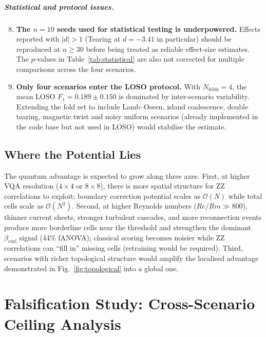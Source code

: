 \documentclass[12pt, a4paper, oneside]{report}
\begin{document}
\paragraph{Statistical and protocol issues.}
\begin{enumerate}
    \setcounter{enumi}{7}
    \item \textbf{The $n = 10$ seeds used for statistical testing is underpowered.} Effects reported with $|d| > 1$ (Tearing at $d = -3.41$ in particular) should be reproduced at $n \ge 30$ before being treated as reliable effect-size estimates. The $p$-values in Table~\ref{tab:statistical} are also not corrected for multiple comparisons across the four scenarios.
    \item \textbf{Only four scenarios enter the LOSO protocol.} With $N_{\text{folds}} = 4$, the mean LOSO $F_1 = 0.189 \pm 0.150$ is dominated by inter-scenario variability. Extending the fold set to include Lamb--Oseen, island coalescence, double tearing, magnetic twist and noisy uniform scenarios (already implemented in the code base but not used in LOSO) would stabilise the estimate.
\end{enumerate}

\section{Where the Potential Lies}

The quantum advantage is expected to grow along three axes. First, at higher VQA resolution ($4\times 4$ or $8\times 8$), there is more spatial structure for ZZ correlations to exploit; boundary correction potential scales as $\mathcal{O}(N)$ while total cells scale as $\mathcal{O}(N^2)$. Second, at higher Reynolds numbers ($Re/Rm \gg 800$), thinner current sheets, stronger turbulent cascades, and more reconnection events produce more borderline cells near the threshold and strengthen the dominant $\beta_{\text{curl}}$ signal (44\% fANOVA); classical scoring becomes noisier while ZZ correlations can ``fill in'' missing cells (retraining would be required). Third, scenarios with richer topological structure would amplify the localised advantage demonstrated in Fig.~\ref{fig:topological} into a global one.

\chapter{Falsification Study: Cross-Scenario Ceiling Analysis}
\label{chap:falsification}
\end{document}
